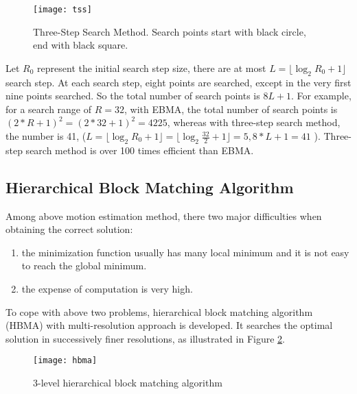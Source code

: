 \documentclass[a4paper, twocolumn]{article}
\begin{document}
	\begin{figure}[h]
	\centering
	\texttt{[image: tss]}
	\caption{Three-Step Search Method. Search points start with black circle, end with black square.}
	\label{fig:tss}
	\end{figure}
	
	\noindent
	Let $ R_{0} $ represent the initial search step size, there are at most $ L = \lfloor   \log_{2}{R_{0} + 1} \rfloor $ search step. At each search step, eight points are searched, except in the very first nine points searched. So the total number of search points is $ 8L + 1 $. For example, for a search range of $ R = 32 $, with EBMA, the total number of search points is $ (2*R+1)^2 = (2*32+1)^2 = 4225 $, whereas with three-step search method, the number is 41, ($ L = \lfloor   \log_{2}{R_{0} + 1} \rfloor = \lfloor   \log_{2}{\frac{32}{2} + 1} \rfloor = 5, 8*L+1 = 41$ ). Three-step search method is over 100 times efficient than EBMA.
	
	\subsection{Hierarchical Block Matching Algorithm}
	Among above motion estimation method, there two major difficulties when obtaining the correct solution:
	\begin{enumerate}
		\item the minimization function usually has many local minimum and it is not easy to reach the global minimum.
		\item the expense of computation is very high.
	\end{enumerate}
	To cope with above two problems, hierarchical block matching algorithm (HBMA) with multi-resolution approach is developed. It searches the optimal solution in successively finer resolutions, as illustrated in Figure \ref{fig:hbma}.
	
	\begin{figure}[h]
	\centering
	\texttt{[image: hbma]}
	\caption{3-level hierarchical block matching algorithm}
	\label{fig:hbma}
	\end{figure}
\end{document}
